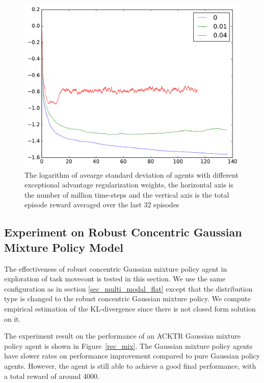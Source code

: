\begin{figure}[!htbp]
	\includegraphics[width=\textwidth]{images/rec_std_adv_reg.pdf}
	\centering
	\caption{The logarithm of avearge standard deviation of agents with different exceptional advantage regularization weights, the horizontal axis is the number of million time-steps and the vertical axis is the total episode reward averaged over the last 32 episodes}\label{rec_std_adv_reg}
\end{figure}

\subsection{Experiment on Robust Concentric Gaussian Mixture Policy Model}
The effectiveness of robust concentric Gaussian mixture policy agent in exploration of task movecont is tested in this section. We use the same configuration as in section \ref{sec_multi_modal_flat} except that the distribution type is changed to the robust concentric Gaussian mixture policy. We compute empirical estimation of the KL-divergence since there is not closed form solution on it.

The experiment result on the performance of an ACKTR Gaussian mixture policy agent is shown in Figure~\ref{rec_mix}. The Gaussian mixture policy agents have slower rates on performance improvement compared to pure Gaussian policy agents. However, the agent is still able to achieve a good final performance, with a total reward of around 4000.

